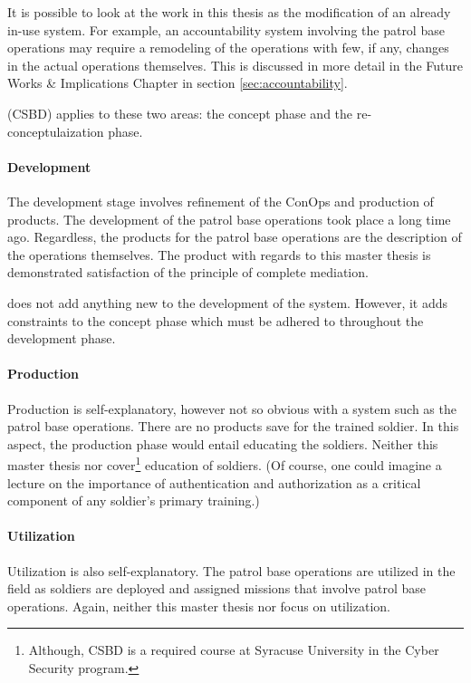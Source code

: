 \documentclass[../../main/main.tex]{subfiles}
\begin{document}
It is possible to look at the work in this thesis as the modification of an already in-use system. For example, an accountability system involving the patrol base operations may require a remodeling of the operations with few, if any, changes in the actual operations themselves.  This is discussed in more detail in the Future Works \& Implications Chapter in section \ref{sec:accountability}.

 (CSBD) applies to these two areas: the concept phase and the re-conceptulaization phase.
 
\paragraph*{Development}
The development stage involves refinement of the ConOps and production of products.  The development of the patrol base operations took place a long time ago.  Regardless, the products for the patrol base operations are the description of the operations themselves. The product with regards to this master thesis is demonstrated satisfaction of the principle of complete mediation.

 does not add anything new to the development of the system.  However, it adds constraints to the concept phase which must be adhered to throughout the development phase.

\paragraph*{Production}
Production is self-explanatory, however not so obvious with a system such as the patrol base operations.  There are no products save for the trained soldier.  In this aspect, the production phase would entail educating the soldiers.  Neither this master thesis nor  cover\footnote{Although, CSBD is a required course at Syracuse University in the Cyber Security program.} education of soldiers. (Of course, one could imagine a lecture on the importance of authentication and authorization as a critical component of any soldier's primary training.)

\paragraph*{Utilization}
Utilization is also self-explanatory.  The patrol base operations are utilized in the field as soldiers are deployed and assigned missions that involve patrol base operations. Again, neither this master thesis nor  focus on utilization.
\end{document}
